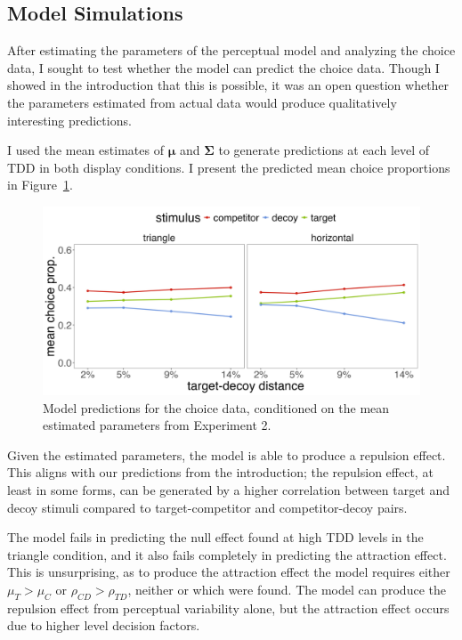 \subsection{Model Simulations}
After estimating the parameters of the perceptual model and analyzing the choice data, I sought to test whether the model can predict the choice data. Though I showed in the introduction that this is possible, it was an open question whether the parameters estimated from actual data would produce qualitatively interesting predictions.

I used the mean estimates of $\boldsymbol{\mu}$ and $\boldsymbol{\Sigma}$ to generate predictions at each level of TDD in both display conditions. I present the predicted mean choice proportions in Figure~\ref{fig:e2_model_preds}. 

\begin{figure}
   \includegraphics[width=\textwidth]{figures/bayes_circle_area_sim_choice_sigma_constant_comp_effect.jpeg}
   \caption{Model predictions for the choice data, conditioned on the mean estimated parameters from Experiment 2.}
   \label{fig:e2_model_preds}
\end{figure}

Given the estimated parameters, the model is able to produce a repulsion effect. This aligns with our predictions from the introduction; the repulsion effect, at least in some forms, can be generated by a higher correlation between target and decoy stimuli compared to target-competitor and competitor-decoy pairs.

The model fails in predicting the null effect found at high TDD levels in the triangle condition, and it also fails completely in predicting the attraction effect. This is unsurprising, as to produce the attraction effect the model requires either $\mu_{T}>\mu_{C}$ or $\rho_{CD}>\rho_{TD}$, neither or which were found. The model can produce the repulsion effect from perceptual variability alone, but the attraction effect occurs due to higher level decision factors.

